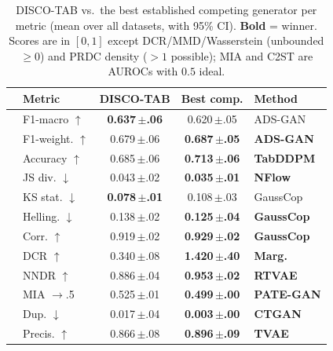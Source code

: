 \begin{table}[t]\centering\small
\setlength{\tabcolsep}{4pt}\renewcommand{\arraystretch}{1.1}
\caption{DISCO-TAB vs.\ the best established competing generator per metric (mean over all datasets, with 95\% CI). \textbf{Bold} = winner. Scores are in $[0,1]$ except DCR/MMD/Wasserstein (unbounded $\geq 0$) and PRDC density ($>1$ possible); MIA and C2ST are AUROCs with $0.5$ ideal.}
\label{tab:vsbest}
\begin{tabular}{@{}clccl@{}}
\toprule
& \textbf{Metric} & \textbf{DISCO-TAB} & \textbf{Best comp.} & \textbf{Method} \\
\midrule
{} & F1-macro $\uparrow$ & \textbf{0.637\,{\tiny$\pm$.06}} & 0.620\,{\tiny$\pm$.05} & ADS-GAN \\
 & F1-weight. $\uparrow$ & 0.679\,{\tiny$\pm$.06} & \textbf{0.687\,{\tiny$\pm$.05}} & \textbf{ADS-GAN} \\
 & Accuracy $\uparrow$ & 0.685\,{\tiny$\pm$.06} & \textbf{0.713\,{\tiny$\pm$.06}} & \textbf{TabDDPM} \\
\midrule
{} & JS div. $\downarrow$ & 0.043\,{\tiny$\pm$.02} & \textbf{0.035\,{\tiny$\pm$.01}} & \textbf{NFlow} \\
 & KS stat. $\downarrow$ & \textbf{0.078\,{\tiny$\pm$.01}} & 0.108\,{\tiny$\pm$.03} & GaussCop \\
 & Helling. $\downarrow$ & 0.138\,{\tiny$\pm$.02} & \textbf{0.125\,{\tiny$\pm$.04}} & \textbf{GaussCop} \\
 & Corr. $\uparrow$ & 0.919\,{\tiny$\pm$.02} & \textbf{0.929\,{\tiny$\pm$.02}} & \textbf{GaussCop} \\
\midrule
{} & DCR $\uparrow$ & 0.340\,{\tiny$\pm$.08} & \textbf{1.420\,{\tiny$\pm$.40}} & \textbf{Marg.} \\
 & NNDR $\uparrow$ & 0.886\,{\tiny$\pm$.04} & \textbf{0.953\,{\tiny$\pm$.02}} & \textbf{RTVAE} \\
 & MIA $\to$.5 & 0.525\,{\tiny$\pm$.01} & \textbf{0.499\,{\tiny$\pm$.00}} & \textbf{PATE-GAN} \\
 & Dup. $\downarrow$ & 0.017\,{\tiny$\pm$.04} & \textbf{0.003\,{\tiny$\pm$.00}} & \textbf{CTGAN} \\
\midrule
{} & Precis. $\uparrow$ & 0.866\,{\tiny$\pm$.08} & \textbf{0.896\,{\tiny$\pm$.09}} & \textbf{TVAE} \\

\end{tabular}
\end{table}
